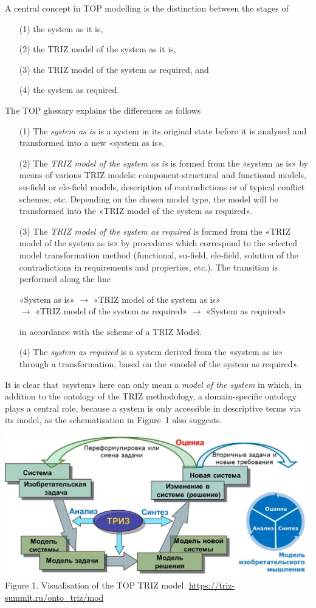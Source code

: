 \documentclass[11pt,a4paper]{article}
\begin{document}
A central concept in TOP modelling is the distinction between the stages of 
\begin{itemize}[noitemsep]
\item [(1)] the system as it is,
\item [(2)] the TRIZ model of the system as it is,
\item [(3)] the TRIZ model of the system as required, and 
\item [(4)] the system as required. 
\end{itemize}
The TOP glossary \cite{TOP-Glossary} explains the differences as follows
\begin{itemize}[noitemsep]
\item [(1)] The \emph{system as is} is a system in its original state before
  it is analysed and transformed into a new «system as is».
\item [(2)] The \emph{TRIZ model of the system as is} is formed from the
  «system as is» by means of various TRIZ models: component-structural and
  functional models, su-field or ele-field models, description of
  contradictions or of typical conflict schemes, etc. Depending on the chosen
  model type, the model will be transformed into the «TRIZ model of the system
  as required».
\item [(3)] The \emph{TRIZ model of the system as required} is formed from the
  «TRIZ model of the system as is» by procedures which correspond to the
  selected model transformation method (functional, su-field, ele-field,
  solution of the contradictions in requirements and properties, etc.). The
  transition is performed along the line
  \begin{center}
    «System as is» $\to$ «TRIZ model of the system as is»\\ $\to$ «TRIZ model
    of the system as required» $\to$ «System as required»
  \end{center}
  in accordance with the scheme of a TRIZ Model.
\item [(4)] The \emph{system as required} is a system derived from the «system
  as is» through a transformation, based on the «model of the system as
  required».
 \end{itemize}
It is clear that «system» here can only mean a \emph{model of the system} in
which, in addition to the ontology of the TRIZ methodology, a domain-specific
ontology plays a central role, because a system is only accessible in
descriptive terms via its model, as the schematisation in Figure~1 also
suggests.
\begin{center}
  \includegraphics[width=.6\textwidth]{figures/Rubin.jpeg}\\
  Figure 1. Visualisation of the TOP TRIZ model.
  \url{https://triz-summit.ru/onto_triz/mod}
\end{center}
\end{document}
